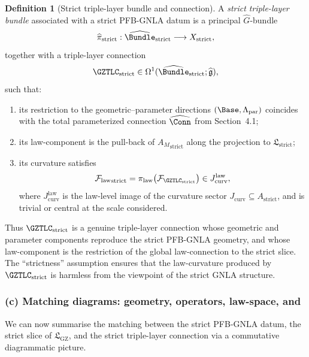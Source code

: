 \documentclass[11pt]{book}
\theoremstyle{plain}
\theoremstyle{definition}
\newtheorem{definition}[theorem]{Definition} \theoremstyle{remark}
\newcommand{\GZLS}{\ensuremath{\mathfrak{L}_{\mathrm{GZ}}}}       \newcommand{\GZLT}{\ensuremath{M_{!w}}}                           \newcommand{\GZLOC}{\ensuremath{A_M}}                             \newcommand{\GZLCurv}{\ensuremath{\mathcal{F}_{\mathrm{law}}}}
\begin{document}
\begin{definition}[Strict triple-layer bundle and connection]
A \emph{strict triple-layer bundle} associated with a strict
  PFB-GNLA datum is a principal $\widehat{G}$-bundle
  \[
     \widehat{\pi}_{\mathrm{strict}}:
       \widehat{\Bundle}_{\mathrm{strict}}
       \longrightarrow
       X_{\mathrm{strict}},
  \]
  together with a triple-layer connection
  \[
     \GZTLC_{\mathrm{strict}}
     \in
     \Omega^1(\widehat{\Bundle}_{\mathrm{strict}};\widehat{\mathfrak{g}}),
  \]
  such that:
  \begin{enumerate}[label=\roman*)]
    \item its restriction to the geometric–parameter directions
          $(\Base,\Lambda_{\mathrm{par}})$ coincides with the total
          parameterized connection $\widehat{\Conn}$ from Section~4.1;
    \item its law-component is the pull-back of
          ${\GZLOC}_{\mathrm{strict}}$ along the projection to
          $\mathfrak{L}_{\mathrm{strict}}$;
    \item its curvature satisfies
          \[
             {\GZLCurv}_{\mathrm{strict}}
             =
             \pi_{\mathrm{law}}
               \bigl(\mathcal{F}_{\GZTLC_{\mathrm{strict}}}\bigr)
             \in
             J_{\mathrm{curv}}^{\mathrm{law}},
          \]
          where $J_{\mathrm{curv}}^{\mathrm{law}}$ is the law-level
          image of the curvature sector $J_{\mathrm{curv}}\subseteq
          A_{\mathrm{strict}}$, and is trivial or central at the scale
          considered.
  \end{enumerate}
\end{definition}

Thus $\GZTLC_{\mathrm{strict}}$ is a genuine triple-layer connection
whose geometric and parameter components reproduce the strict PFB-GNLA
geometry, and whose law-component is the restriction of the global
law-connection to the strict slice. The “strictness” assumption ensures
that the law-curvature produced by $\GZTLC_{\mathrm{strict}}$ is
harmless from the viewpoint of the strict GNLA structure.



\subsubsection*{(c) Matching diagrams: geometry, operators, law-space, and \GZTLC}

We can now summarise the matching between the strict PFB-GNLA datum,
the strict slice of \GZLS, and the strict triple-layer connection via a
commutative diagrammatic picture.
\end{document}
